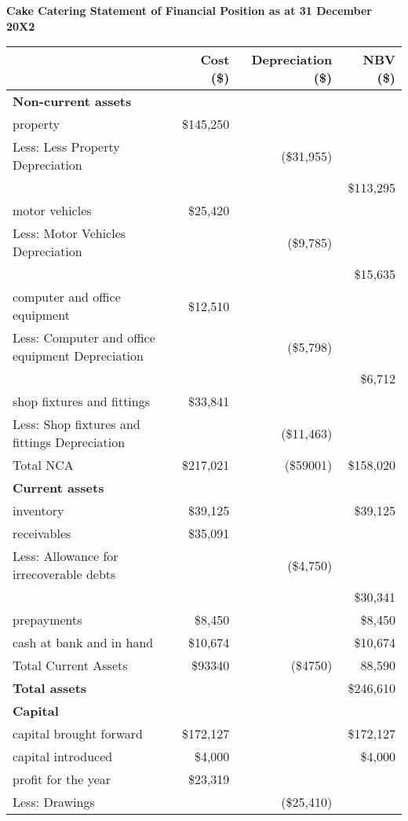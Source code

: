

\textbf{Cake Catering Statement of Financial Position as at 31 December 20X2}

\begin{center}
\begin{tabular}{lrrr}
\toprule
 & \textbf{Cost (\$)} & \textbf{Depreciation (\$)} & \textbf{NBV (\$)} \\
\midrule
\textbf{Non-current assets} & & & \\
 property & \$145,250 & & \\ 
Less: Less Property Depreciation &  &  (\$31,955)  \\ 
 & & & \$113,295 \\ 
motor vehicles & \$25,420 & & \\ 
Less: Motor Vehicles Depreciation &  &  (\$9,785)  \\ 
 & & & \$15,635 \\ 
computer and office equipment & \$12,510 & & \\ 
Less: Computer and office equipment Depreciation &  &  (\$5,798)  \\ 
 & & & \$6,712 \\ 
shop fixtures and fittings & \$33,841 & & \\ 
Less: Shop fixtures and fittings Depreciation &  &  (\$11,463)  \\ 

\addlinespace
Total NCA & \$217,021 & (\$59001) & \$158,020 \\
\midrule
\textbf{Current assets} & & & \\
 inventory & \$39,125 &  & \$39,125 \\ 
receivables & \$35,091 & & \\ 
Less: Allowance for irrecoverable debts &  &  (\$4,750)  \\ 
 & & & \$30,341 \\ 
prepayments & \$8,450 &  & \$8,450 \\ 
cash at bank and in hand & \$10,674 &  & \$10,674 \\ 

\addlinespace
Total Current Assets & \$93340 & (\$4750) & 88,590 \\
\midrule
\textbf{Total assets} & & & \$246,610 \\
\midrule
\textbf{Capital} & & & \\
 capital brought forward & \$172,127 &  & \$172,127 \\ 
capital introduced & \$4,000 &  & \$4,000 \\ 
profit for the year & \$23,319 & & \\ 
Less: Drawings &  &  (\$25,410)  \\ 


\end{tabular}
\end{center}
